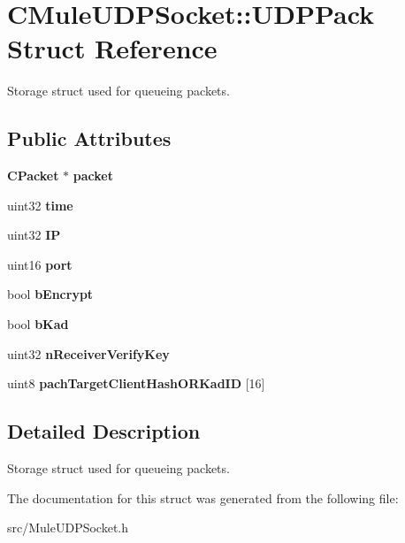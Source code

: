 \section{CMuleUDPSocket::UDPPack Struct Reference}
\label{structCMuleUDPSocket_1_1UDPPack}


Storage struct used for queueing packets.  
\subsection*{Public Attributes}
\begin{DoxyCompactItemize}
\item 
{\bf CPacket} $\ast$ {\bf packet}\label{structCMuleUDPSocket_1_1UDPPack_aff2252d06138263bff1918bd4e2f60b1}

\item 
uint32 {\bf time}\label{structCMuleUDPSocket_1_1UDPPack_a12f3bfa1185b400da37c302274c002e4}

\item 
uint32 {\bf IP}\label{structCMuleUDPSocket_1_1UDPPack_ae18cf2b7971a45857c808db8efa1d541}

\item 
uint16 {\bf port}\label{structCMuleUDPSocket_1_1UDPPack_a0f5547b6d3a843df1f234e505313595c}

\item 
bool {\bf bEncrypt}\label{structCMuleUDPSocket_1_1UDPPack_a43bd08f915adfbcdefd46d0c3ee5b7dd}

\item 
bool {\bf bKad}\label{structCMuleUDPSocket_1_1UDPPack_a020c7489df4214cc8529c203e654c63b}

\item 
uint32 {\bfseries nReceiverVerifyKey}\label{structCMuleUDPSocket_1_1UDPPack_a9df2220d25e177a7f2182c2ad325dd94}

\item 
uint8 {\bfseries pachTargetClientHashORKadID} [16]\label{structCMuleUDPSocket_1_1UDPPack_ae27aaa41998084ade4b922473276bbc6}

\end{DoxyCompactItemize}


\subsection{Detailed Description}
Storage struct used for queueing packets. 

The documentation for this struct was generated from the following file:\begin{DoxyCompactItemize}
\item 
src/MuleUDPSocket.h\end{DoxyCompactItemize}
